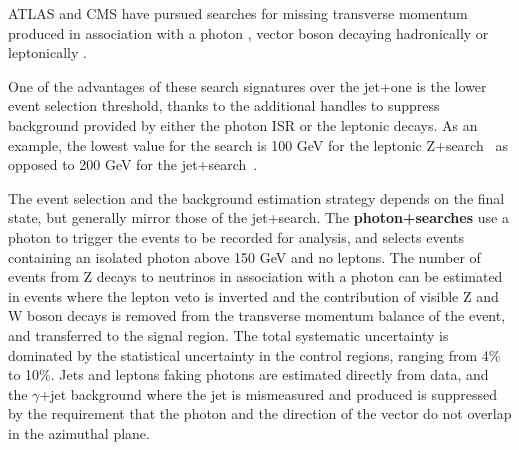 ATLAS and CMS have pursued searches for missing transverse momentum produced in association with a photon%
\cite{Aaboud:2017dor,CMS-PAS-EXO-16-014},%
vector boson decaying hadronically %
\cite{Sirunyan:2017jix,Aaboud:2016qgg} or leptonically %
\cite{Aaboud:2017bja, Sirunyan:2017qfc}. 

One of the advantages of these search signatures over the jet+\MET one
is the lower event selection threshold, thanks to the additional handles to suppress background
provided by either the photon ISR or the leptonic decays. As an example, the lowest \MET 
value for the search is 100 GeV for the leptonic Z+\MET search~\cite{Sirunyan:2017qfc} %
as opposed to 200 GeV for the jet+\MET search~\cite{Sirunyan:2017jix}. 

The event selection and the background estimation strategy depends on the final state, but generally mirror those of the jet+\MET search. 
The \textbf{photon+\MET searches} use a photon to trigger the events to be recorded for analysis, and selects events containing an isolated photon above 150 GeV and no leptons. The number of events from Z decays to neutrinos in association with a photon can be estimated in events where the lepton veto is inverted and the contribution of visible Z and W boson decays is removed from the transverse momentum balance of the event, and transferred to the signal region. The total systematic uncertainty is dominated by the statistical uncertainty in the control regions, ranging from 4\% to 10\%. 
Jets and leptons faking photons are estimated directly from data, and the $\gamma$+jet background where the jet is mismeasured and produced \MET is suppressed by the requirement that the photon and the direction of the \MET vector do not overlap in the azimuthal plane. 


